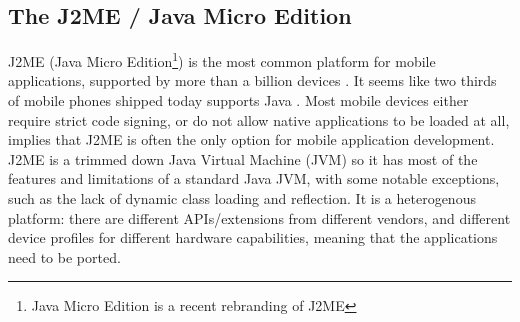 \documentclass[11pt]{report}
\begin{document}
%
%

\subsection{The J2ME / Java Micro Edition}

J2ME (Java Micro Edition\footnote{Java Micro Edition is a recent rebranding of J2ME}) is the most common platform for mobile applications, supported by more than a billion devices \cite{sun-j2me}. 
It seems like two thirds of mobile phones shipped today supports Java \cite{esmertec-globenews}. 
Most mobile devices either require strict code signing, or do not allow native applications to be loaded at all, implies that J2ME is often the only option for mobile application development.
J2ME is a trimmed down Java Virtual Machine (JVM) so it has most of the features and limitations of a standard Java JVM, with some notable exceptions, such as the lack of dynamic class loading and reflection. It is a heterogenous platform:
there are different APIs/extensions from different vendors, and different device profiles for different hardware capabilities, meaning that the applications need to be ported.
\end{document}
